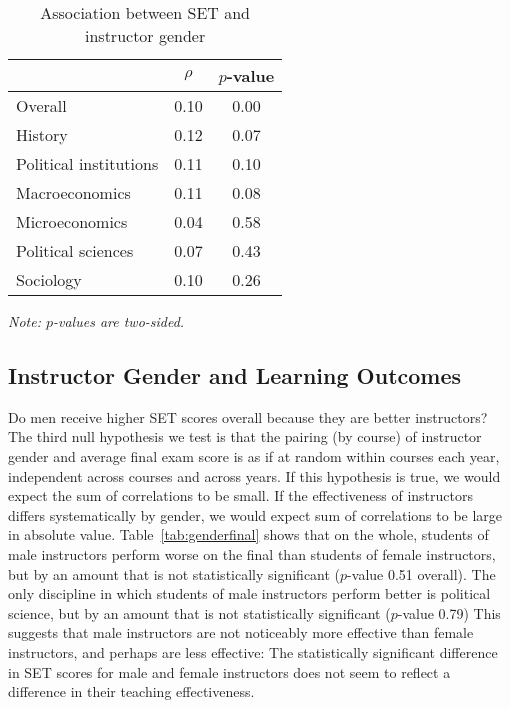 \documentclass[12pt]{article}
\begin{document}
\begin{table}[htbp]
  \centering
  \footnotesize 
  \caption{Association between SET and instructor gender}
    \begin{tabular}{lcc}
    \toprule 
                          & $\rho$  & $p$-value     \\
   \midrule
    Overall &                 0.10       & 0.00     \\
    History &                 0.12       & 0.07     \\
    Political institutions &  0.11       & 0.10     \\
    Macroeconomics &          0.11       & 0.08     \\
    Microeconomics &          0.04       & 0.58     \\
    Political sciences &      0.07       & 0.43     \\
    Sociology &               0.10       & 0.26     \\
    \bottomrule
    \end{tabular}%
 \label{tab:instructorgender}%
  
  \textit{Note: $p$-values are two-sided.}
\end{table}%
\normalsize

\subsection{Instructor Gender and Learning Outcomes} \label{sec:Fr-gender-final}
Do men receive higher SET scores overall because they are better instructors? 
The third null hypothesis we test is that the pairing (by course) of instructor gender and
average final exam score is as if at random within courses each year, independent
across courses and across years.
If this hypothesis is true, we would expect the sum of correlations to be small.
If the effectiveness of instructors differs systematically by gender,
we would expect sum of correlations to be large in absolute value. 
Table~\ref{tab:genderfinal} shows that on the whole, students of male instructors
perform worse on the final than students of female instructors, but by an amount that is
not statistically significant ($p$-value 0.51 overall).
The only discipline in which students of male instructors perform better is political science,
but by an amount that is not statistically significant ($p$-value 0.79)
This suggests that male instructors are not noticeably more effective than female instructors, 
and perhaps are less effective:
The statistically significant difference in SET scores for male and female instructors
does not seem to reflect a difference in their teaching effectiveness.
\end{document}
